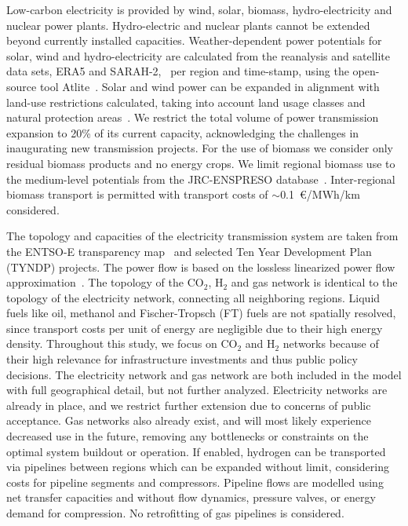 \documentclass[twocolumn]{article}
\newcommand{\COtwo}{CO$_2$}
\newcommand{\Htwo}{H$_2$}
\begin{document}

Low-carbon electricity is provided by wind, solar, biomass, hydro-electricity and nuclear power plants. Hydro-electric and nuclear plants cannot be extended beyond currently installed capacities. Weather-dependent power potentials for solar, wind and hydro-electricity are calculated from the reanalysis and satellite data sets, ERA5 and SARAH-2,~\cite{hersbachERA5GlobalReanalysis2020,pfeifrothSurfaceRadiationData2017} per region and time-stamp, using the open-source tool Atlite~\cite{hofmannAtliteLightweightPython2021}.
Solar and wind power can be expanded in alignment with land-use restrictions calculated, taking into account land usage classes and natural protection areas~\cite{eeaCorineLandCover2012,eeaNatura2000Data2016}. We restrict the total volume of power transmission expansion to 20\% of its current capacity, acknowledging the challenges in inaugurating new transmission projects.
For the use of biomass we consider only residual biomass products and no energy crops. We limit regional biomass use to the medium-level potentials from the JRC-ENSPRESO database~\cite{enspreso_database,instituteforenergyandtransportjointresearchcentreJRCEUTIMESModelBioenergy2015}. Inter-regional biomass transport is permitted with transport costs of $\sim$0.1~€/MWh/km considered.


The topology and capacities of the electricity transmission system are taken from the ENTSO-E transparency map~\cite{wiegmansGridkitExtractEntsoE2016} and selected Ten Year Development Plan (TYNDP) projects. The power flow is based on the lossless linearized power flow approximation~.
The topology of the \COtwo{}, \Htwo{} and gas network is identical to the topology of the electricity network, connecting all neighboring regions. Liquid fuels like oil, methanol and Fischer-Tropsch (FT) fuels are not spatially resolved, since transport costs per unit of energy are negligible due to their high energy density. Throughout this study, we focus on \COtwo{} and \Htwo{} networks because of their high relevance for infrastructure investments and thus public policy decisions. The electricity network and gas network are both included in the model with full geographical detail, but not further analyzed. Electricity networks are already in place, and we restrict further extension due to concerns of public acceptance. Gas networks also already exist, and will most likely experience decreased use in the future, removing any bottlenecks or constraints on the optimal system buildout or operation.
If enabled, hydrogen can be transported via pipelines between regions which can be expanded without limit, considering costs for pipeline segments and compressors. Pipeline flows are modelled using net transfer capacities and without flow dynamics, pressure valves, or energy demand for compression. No retrofitting of gas pipelines is considered.
\end{document}

